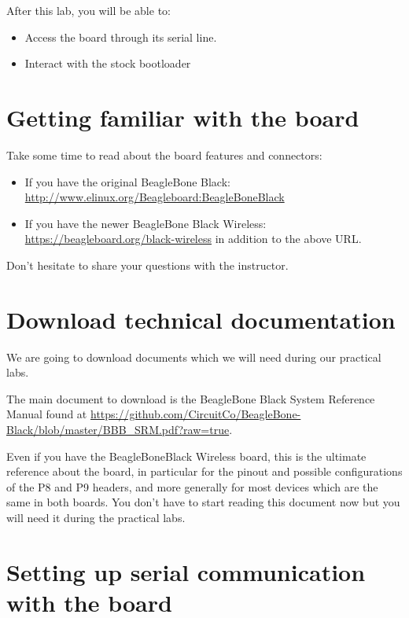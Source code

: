 
After this lab, you will be able to:
\begin{itemize}
\item Access the board through its serial line.
\item Interact with the stock bootloader
\end{itemize}

\section{Getting familiar with the board}

Take some time to read about the board features and connectors:

\begin{itemize}
   \item If you have the original BeagleBone Black: \url{http://www.elinux.org/Beagleboard:BeagleBoneBlack}
   \item If you have the newer BeagleBone Black Wireless:
\url{https://beagleboard.org/black-wireless} in addition to the above URL. 
\end{itemize}

Don't hesitate to share your questions with the instructor.

\section{Download technical documentation}

We are going to download documents which we will need during our
practical labs.

The main document to download is the BeagleBone Black System Reference Manual found at
\url{https://github.com/CircuitCo/BeagleBone-Black/blob/master/BBB_SRM.pdf?raw=true}.

Even if you have the BeagleBoneBlack Wireless board, this is the
ultimate reference about the board, in particular for the pinout and
possible configurations of the P8 and P9 headers, and more generally
for most devices which are the same in both boards.
You don't have to start reading this document now but you will need it
during the practical labs.

\section{Setting up serial communication with the board}

